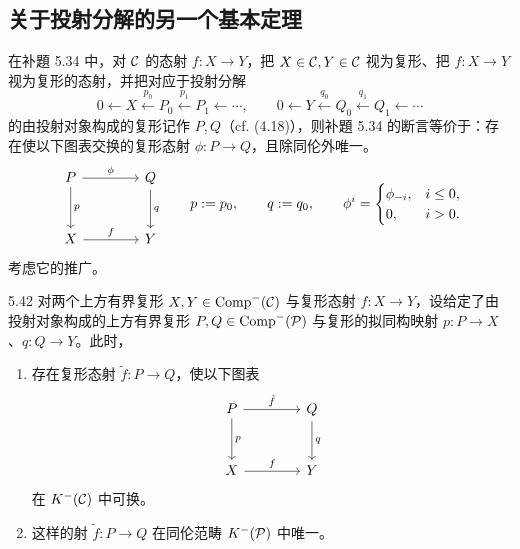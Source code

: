 \subsection{关于投射分解的另一个基本定理}

在补題 5.34 中，对 $\mathcal{C}$ 的态射 $f\colon X\to Y$，把 $X\in\mathcal{C}, Y\in\mathcal{C}$ 视为复形、把 $f\colon X\to Y$ 视为复形的态射，并把对应于投射分解
\[
  0\leftarrow X\xleftarrow{p_0}P_0\xleftarrow{p_1}P_1\leftarrow\cdots,\qquad
  0\leftarrow Y\xleftarrow{q_0}Q_0\xleftarrow{q_1}Q_1\leftarrow\cdots
\]
的由投射对象构成的复形记作 $P, Q$（cf. (4.18)），则补題 5.34 的断言等价于：存在使以下图表交换的复形态射 $\phi\colon P\to Q$，且除同伦外唯一。
\[\begin{tikzcd}[row sep=2.8em, column sep=4.0em]
P \arrow[r,"\phi"] \arrow[d,"p"] & Q \arrow[d,"q"]\\
X \arrow[r,"f"] & Y
\end{tikzcd}
\qquad
p:=p_0,\qquad q:=q_0,\qquad
\phi^i=\begin{cases}\phi_{-i}, & i\le 0,\\ 0, & i>0.\end{cases}\]
考虑它的推广。

\begin{theorem}{5.42}
对两个上方有界复形 $X, Y\in\operatorname{Comp}^-(\mathcal{C})$ 与复形态射 $f\colon X\to Y$，设给定了由投射对象构成的上方有界复形 $P, Q\in\operatorname{Comp}^-(\mathcal{P})$ 与复形的拟同构映射 $p\colon P\to X$、$q\colon Q\to Y$。此时，
\begin{enumerate}[label=(\roman*)]
  \item 存在复形态射 $\tilde f\colon P\to Q$，使以下图表
\[\begin{tikzcd}[row sep=2.8em, column sep=4.0em]
P \arrow[r,"\tilde f"] \arrow[d,"p"] & Q \arrow[d,"q"]\\
X \arrow[r,"f"] & Y
\end{tikzcd}\]
 在 $K^-(\mathcal{C})$ 中可换。
  \item 这样的射 $\tilde f\colon P\to Q$ 在同伦范畴 $K^-(\mathcal{P})$ 中唯一。
\end{enumerate}
\end{theorem}


